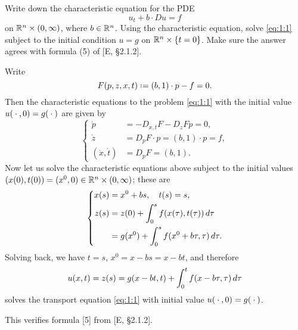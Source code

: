 \begin{problem}
  Write down the characteristic equation for the PDE
  \[
    \label{eq:1:1}
    \tag{\(*\)}
    u_t+b\cdot Du=f
  \]
  on \(\mathbb{R}^n\times(0,\infty)\), where \(b\in\mathbb{R}^n\). Using the characteristic
  equation, solve \eqref{eq:1:1} subject to the initial condition \(u=g\)
  on \(\mathbb{R}^n\times\{t=0\}\). Make sure the answer agrees with formula (5) of
  [E, \S 2.1.2].
\end{problem}
\begin{solution*}
  Write
  \[
    F(p,z,x,t)\defeq (b,1)\cdot p-f=0.
  \]
  Then the characteristic equations to the problem \eqref{eq:1:1} with the
  initial value \(u({}\cdot{},0)=g({}\cdot{})\) are given by
  \[
    \left\{
      \begin{aligned}
        \dot p&=-D_{x,t}F-D_zFp=0,\\
        \dot z&=D_pF\cdot p=(b,1)\cdot p=f,\\
        (\dot x,\dot t)&=D_pF=(b,1).
      \end{aligned}
    \right.
  \]
  Now let us solve the characteristic equations above subject to the
  initial values \((x(0),t(0))=(x^0,0)\in\mathbb{R}^n\times(0,\infty)\);
  these are
  \[
    \left\{
      \begin{aligned}
        x(s)
        &=x^0+bs,\quad t(s)=s,\\
        z(s)
        &=z(0)+\int_0^s f(x(\tau),t(\tau))\mathop{}\!d\tau\\
        &=g(x^0)+\int_0^s f(x^0+b\tau,\tau)\mathop{}\!d\tau.
      \end{aligned}
    \right.
  \]
  Solving back, we have \(t=s\), \(x^0=x-bs=x-bt\), and therefore
  \[
    u(x,t)=z(s)=g(x-bt,t)+\int_0^t f(x-b\tau, \tau)\mathop{}\!d\tau
  \]
  solves the transport equation \eqref{eq:1:1} with initial value
  \(u({}\cdot{},0)=g({}\cdot{})\).

  This verifies formula [5] from [E, \S 2.1.2].
\end{solution*}

